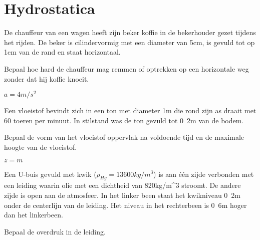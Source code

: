 \chapter{Hydrostatica}
\label{sec:Hydrostatica}
	\begin{toepassing}
		\label{koffie}
De chauffeur van een wagen heeft zijn beker koffie in de bekerhouder gezet tijdens het rijden. De beker is cilindervormig met een diameter van \unit{5}{cm}, is gevuld tot op \unit{1}{cm} van de rand en staat horizontaal.
		
Bepaal hoe hard de chauffeur mag remmen of optrekken op een horizontale weg zonder dat hij koffie knoeit.
	\end{toepassing}
	\begin{antwoord}
		$a = \unit{4}{m/s^2}$
	\end{antwoord}
	\begin{toepassing*}
		\label{rotatiegieten}
Een vloeistof bevindt zich in een ton met diameter \unit{1}{m} die rond zijn as draait met 60 toeren per minuut. In stilstand was de ton gevuld tot \unit{0.2}{m} van de bodem. 
		
Bepaal de vorm van het vloeistof oppervlak na voldoende tijd en de maximale hoogte van de vloeistof.
		\begin{center}
			
		\end{center}
	\end{toepassing*}
	\begin{antwoord}
		$z = \unit{}{m}$ 
	\end{antwoord}
	\begin{toepassing}
		\label{u-buis}
Een U-buis gevuld met kwik ($\rho_{Hg}=\unit{13600}{kg/m^3}$) is aan \'e\'en zijde verbonden met een leiding waarin olie met een dichtheid van \unit{820}{kg/m^3} stroomt. De andere zijde is open aan de atmosfeer. In het linker been staat het kwikniveau \unit{0.2}{m} onder de centerlijn van de leiding. Het niveau in het rechterbeen is \unit{0.6}{m} hoger dan het linkerbeen.
		
Bepaal de overdruk in de leiding.
	\end{toepassing}
